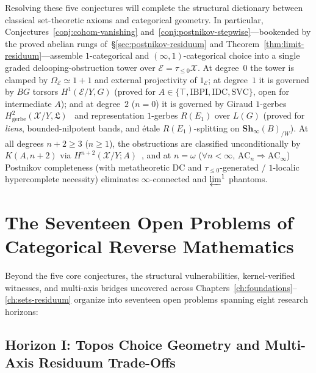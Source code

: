 \documentclass[10pt,twoside,openright]{book}
\theoremstyle{crmplain}
\theoremstyle{crmdef}
\theoremstyle{crmremark}
\begin{document}
Resolving these five conjectures will complete the structural dictionary between classical set-theoretic axioms and categorical geometry. In particular, Conjectures~\ref{conj:cohom-vanishing} and~\ref{conj:postnikov-stepwise}---bookended by the proved abelian rungs of~\S\ref{sec:postnikov-residuum} and Theorem~\ref{thm:limit-residuum}---assemble $1$-categorical and $(\infty, 1)$-categorical choice into a single graded delooping-obstruction tower over $\mathcal{E} = \tau_{\le 0}\mathcal{X}$. At degree~$0$ the tower is clamped by $\Omega_{\mathcal{E}} \simeq 1+1$ and external projectivity of $1_{\mathcal{E}}$; at degree~$1$ it is governed by $BG$ torsors $H^1(\mathcal{E}/Y, G)$ (proved for $A \in \{\top, \mathrm{IBPI}, \mathrm{IDC}, \mathrm{SVC}\}$, open for intermediate $A$); and at degree~$2$ ($n = 0$) it is governed by Giraud $1$-gerbes $H^2_{\mathrm{gerbe}}(\mathcal{X}/Y, \mathfrak{L})$~\cite{Giraud71} and representation $1$-gerbes $R(E_1)$ over $L(G)$ (proved for \emph{liens}, bounded-nilpotent bands, and \'etale $R(E_1)$-splitting on $\mathbf{Sh}_\infty(B)_{/W}$). At all degrees $n + 2 \ge 3$ ($n \ge 1$), the obstructions are classified unconditionally by $K(A, n+2)$ via $H^{n+2}(\mathcal{X}/Y; A)$~\cite[\S7.2.2]{Lurie09}, and at $n = \omega$ ($\forall n < \infty,\, \mathrm{AC}_n \Rightarrow \mathrm{AC}_\infty$) Postnikov completeness (with metatheoretic $\mathrm{DC}$ and $\tau_{\le 0}$-generated / $1$-localic hypercomplete necessity) eliminates $\infty$-connected and $\varprojlim^1$ phantoms.

\section{The Seventeen Open Problems of Categorical Reverse Mathematics}\label{sec:seventeen-open-problems}

Beyond the five core conjectures, the structural vulnerabilities, kernel-verified witnesses, and multi-axis bridges uncovered across Chapters~\ref{ch:foundations}--\ref{ch:sets-residuum} organize into seventeen open problems spanning eight research horizons:

\subsection*{Horizon I: Topos Choice Geometry and Multi-Axis Residuum Trade-Offs}
\end{document}
